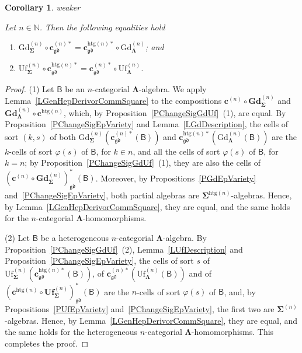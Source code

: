\documentclass[a4paper, reqno]{amsbook}
\makeatletter
\newcommand{\sig}[1]{\mathbf{#1}}             %
\newcommand{\calg}[1]{\boldsymbol{\mathsf{#1}}} %
\newcommand{\gd}{\mathfrak{gd}}              %
\newcommand{\htg}{\mathrm{htg}}                %
\newcommand{\Gd}{\mathrm{Gd}}
\newcommand{\Uf}{\mathrm{Uf}}
\newcommand{\bGd}{\mathbf{Gd}}
\newcommand{\bUf}{\mathbf{Uf}}
\theoremstyle{plain}
\newtheorem{corollary}[theorem]{Corollary}
\theoremstyle{definition}
\newcommand*{\CA@leanpending}{}
\newcommand*{\CA@leanrelation}{}
\newcommand*{\lean}[2]{%
  \ifcsname\string\color@lean@#1\endcsname\else
    \PackageError{main}{Unknown relation `#1' in \string\lean}{Use equivalent, weaker or stronger.}%
  \fi
  \gdef\CA@leanrelation{#1}%
  \gdef\CA@leanpending{#2}}
\makeatother
\begin{document}
\begin{corollary}\label{CChangeSigGdUf}\lean{weaker}{ChangeOfSignature.graduationFunctorChange,ChangeOfSignature.unificationFunctorChange}
Let $n\in\mathbb{N}$.
Then the following equalities hold
\begin{enumerate}
	\item
	$\Gd^{(n)}_{\sig{\Sigma}}\circ\mathbf{c}^{(n)\ast}_{\gd}=\mathbf{c}^{\htg(n)\ast}_{\gd}\circ\Gd^{(n)}_{\sig{\Lambda}}$; and

	\item
	$\Uf^{(n)}_{\sig{\Sigma}}\circ\mathbf{c}^{\htg(n)\ast}_{\gd}=\mathbf{c}^{(n)\ast}_{\gd}\circ\Uf^{(n)}_{\sig{\Lambda}}$.
\end{enumerate}
\end{corollary}
\begin{proof}
(1) Let $\calg{B}$ be an $n$-categorial $\sig{\Lambda}$-algebra.
We apply Lemma~\ref{LGenHepDerivorCommSquare} to the compositions $\mathbf{c}^{(n)}\circ\bGd^{(n)}_{\sig{\Sigma}}$ and $\bGd^{(n)}_{\sig{\Lambda}}\circ\mathbf{c}^{\htg(n)}$, which, by Proposition~\ref{PChangeSigGdUf}~(1), are equal.
By Proposition~\ref{PChangeSigEpVariety} and Lemma~\ref{LGdDescription}, the cells of sort $(k,s)$ of both $\Gd^{(n)}_{\sig{\Sigma}}(\mathbf{c}^{(n)\ast}_{\gd}(\calg{B}))$ and $\mathbf{c}^{\htg(n)\ast}_{\gd}(\Gd^{(n)}_{\sig{\Lambda}}(\calg{B}))$ are the $k$-cells of sort $\varphi(s)$ of $\calg{B}$, for $k\in n$, and all the cells of sort $\varphi(s)$ of $\calg{B}$, for $k=n$; by Proposition~\ref{PChangeSigGdUf}~(1), they are also the cells of $(\mathbf{c}^{(n)}\circ\bGd^{(n)}_{\sig{\Sigma}})^{\ast}_{\gd}(\calg{B})$.
Moreover, by Propositions~\ref{PGdEpVariety} and~\ref{PChangeSigEpVariety}, both partial algebras are $\sig{\Sigma}^{\htg(n)}$-algebras.
Hence, by Lemma~\ref{LGenHepDerivorCommSquare}, they are equal, and the same holds for the $n$-categorial $\sig{\Lambda}$-homomorphisms.

(2) Let $\calg{B}$ be a heterogeneous $n$-categorial $\sig{\Lambda}$-algebra.
By Proposition~\ref{PChangeSigGdUf}~(2), Lemma~\ref{LUfDescription} and Proposition~\ref{PChangeSigEpVariety}, the cells of sort $s$ of $\Uf^{(n)}_{\sig{\Sigma}}(\mathbf{c}^{\htg(n)\ast}_{\gd}(\calg{B}))$, of $\mathbf{c}^{(n)\ast}_{\gd}(\Uf^{(n)}_{\sig{\Lambda}}(\calg{B}))$ and of $(\mathbf{c}^{\htg(n)}\circ\bUf^{(n)}_{\sig{\Sigma}})^{\ast}_{\gd}(\calg{B})$ are the $n$-cells of sort $\varphi(s)$ of $\calg{B}$, and, by Propositions~\ref{PUfEpVariety} and~\ref{PChangeSigEpVariety}, the first two are $\sig{\Sigma}^{(n)}$-algebras.
Hence, by Lemma~\ref{LGenHepDerivorCommSquare}, they are equal, and the same holds for the heterogeneous $n$-categorial $\sig{\Lambda}$-homomorphisms. This completes the proof.
\end{proof}
\end{document}
